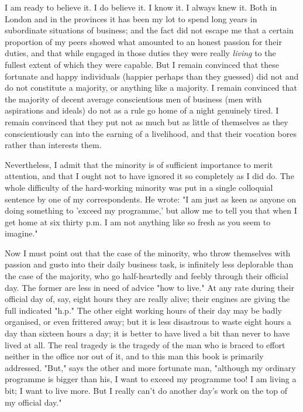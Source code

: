 I am ready to believe it.  I do believe it.  I know it.  I always knew
it.  Both in London and in the provinces it has been my lot to spend
long years in subordinate situations of business; and the fact did not
escape me that a certain proportion of my peers showed what amounted to
an honest passion for their duties, and that while engaged in those
duties they were really \textit{living} to the fullest extent of which they
were capable.  But I remain convinced that these fortunate and happy
individuals (happier perhaps than they guessed) did not and do not
constitute a majority, or anything like a majority.  I remain convinced
that the majority of decent average conscientious men of business (men
with aspirations and ideals) do not as a rule go home of a night
genuinely tired.  I remain convinced that they put not as much but as
little of themselves as they conscientiously can into the earning of a
livelihood, and that their vocation bores rather than interests them.

Nevertheless, I admit that the minority is of sufficient importance to
merit attention, and that I ought not to have ignored it so completely
as I did do.  The whole difficulty of the hard-working minority was put
in a single colloquial sentence by one of my correspondents.  He wrote:
"I am just as keen as anyone on doing something to 'exceed my
programme,' but allow me to tell you that when I get home at six thirty
p.m. I am not anything like so fresh as you seem to imagine."

Now I must point out that the case of the minority, who throw
themselves with passion and gusto into their daily business task, is
infinitely less deplorable than the case of the majority, who go
half-heartedly and feebly through their official day.  The former are
less in need of advice "how to live."  At any rate during their
official day of, say, eight hours they are really alive; their engines
are giving the full indicated "h.p."  The other eight working hours of
their day may be badly organised, or even frittered away; but it is
less disastrous to waste eight hours a day than sixteen hours a day; it
is better to have lived a bit than never to have lived at all. The real
tragedy is the tragedy of the man who is braced to effort neither in
the office nor out of it, and to this man this book is primarily
addressed.  "But," says the other and more fortunate man, "although my
ordinary programme is bigger than his, I want to exceed my programme
too!  I am living a bit; I want to live more. But I really can't do
another day's work on the top of my official day."

